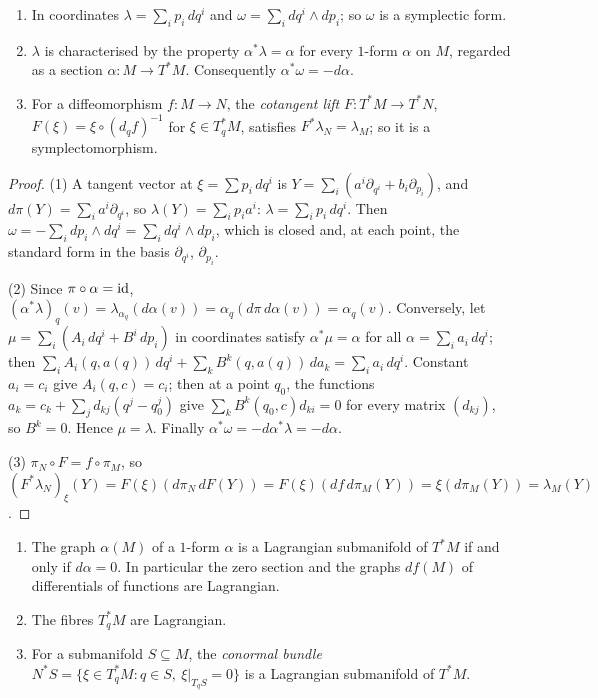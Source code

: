 \begin{proposition}\label{symplectic-geometry:proposition-tautological}
\begin{enumerate}
\item In coordinates $\lambda = \sum_ip_i\,dq^i$ and $\omega = \sum_idq^i \wedge dp_i$; so $\omega$ is a symplectic form.
\item $\lambda$ is characterised by the property $\alpha^*\lambda = \alpha$ for every $1$-form $\alpha$ on $M$, regarded as a section $\alpha \colon M \to T^*M$. Consequently $\alpha^*\omega = -d\alpha$.
\item For a diffeomorphism $f \colon M \to N$, the \emph{cotangent lift} $F \colon T^*M \to T^*N$, $F(\xi) = \xi \circ (d_qf)^{-1}$ for $\xi \in T^*_qM$, satisfies $F^*\lambda_N = \lambda_M$; so it is a
symplectomorphism.
\end{enumerate}
\end{proposition}

\begin{proof}
(1) A tangent vector at $\xi = \sum p_i\,dq^i$ is $Y = \sum_i(a^i\partial_{q^i} + b_i\partial_{p_i})$, and $d\pi(Y) = \sum_ia^i\partial_{q^i}$, so $\lambda(Y) = \sum_ip_ia^i$: $\lambda = \sum_ip_i\,dq^i$. Then
$\omega = -\sum_idp_i \wedge dq^i = \sum_idq^i \wedge dp_i$, which is closed and, at each point, the standard form in the basis $\partial_{q^i}$, $\partial_{p_i}$.

(2) Since $\pi \circ \alpha = \mathrm{id}$, $(\alpha^*\lambda)_q(v) = \lambda_{\alpha_q}(d\alpha(v)) = \alpha_q(d\pi\,d\alpha(v)) = \alpha_q(v)$. Conversely, let $\mu = \sum_i(A_i\,dq^i + B^i\,dp_i)$ in coordinates
satisfy $\alpha^*\mu = \alpha$ for all $\alpha = \sum_ia_i\,dq^i$; then $\sum_iA_i(q, a(q))\,dq^i + \sum_kB^k(q, a(q))\,da_k = \sum_ia_i\,dq^i$. Constant $a_i = c_i$ give $A_i(q, c) = c_i$; then at a point $q_0$,
the functions $a_k = c_k + \sum_jd_{kj}(q^j - q_0^j)$ give $\sum_kB^k(q_0, c)d_{ki} = 0$ for every matrix $(d_{kj})$, so $B^k = 0$. Hence $\mu = \lambda$. Finally $\alpha^*\omega = -d\alpha^*\lambda = -d\alpha$.

(3) $\pi_N \circ F = f \circ \pi_M$, so $(F^*\lambda_N)_\xi(Y) = F(\xi)(d\pi_N\,dF(Y)) = F(\xi)(df\,d\pi_M(Y)) = \xi(d\pi_M(Y)) = \lambda_M(Y)$.
\end{proof}

\begin{corollary}\label{symplectic-geometry:corollary-lagrangian-graphs}
\begin{enumerate}
\item The graph $\alpha(M)$ of a $1$-form $\alpha$ is a Lagrangian submanifold of $T^*M$ if and only if $d\alpha = 0$. In particular the zero section and the graphs $df(M)$ of differentials of functions are
Lagrangian.
\item The fibres $T^*_qM$ are Lagrangian.
\item For a submanifold $S \subseteq M$, the \emph{conormal bundle} $N^*S = \{\xi \in T^*_qM : q \in S, \ \xi|_{T_qS} = 0\}$ is a Lagrangian submanifold of $T^*M$.
\end{enumerate}
\end{corollary}

